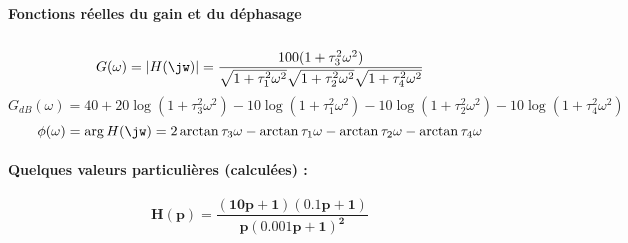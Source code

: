 \paragraph{Fonctions réelles du gain et du déphasage}$\,$\newline
\[
G(\omega)=|H(\jw)|=
\dfrac{100(1+\tau_3^2\omega^2)}
{\sqrt{1+\tau_1^2\omega^2}\sqrt{1+\tau_2^2\omega^2}\sqrt{1+\tau_4^2\omega^2}}
\]
\[
G_{dB}(\omega)=40+
               20\log{(1+\tau_3^2\omega^2)}
              -10\log{(1+\tau_1^2\omega^2)}
              -10\log{(1+\tau_2^2\omega^2)}
              -10\log{(1+\tau_4^2\omega^2)}
\]
\[
\phi(\omega)=\arg{H(\jw)}=
             2\arctan{\tau_3\omega}
             -\arctan{\tau_1\omega}
             -\arctan{\tau_2\omega}
             -\arctan{\tau_4\omega}
\]
\paragraph{Quelques valeurs particulières (calculées) :}
\begin{center}
\end{center}
\newpage
\question{}
\[
\boldsymbol{H(p) = \dfrac{(10p+1)(0.1p+1)}{p(0.001p+1)^2}}
\]
